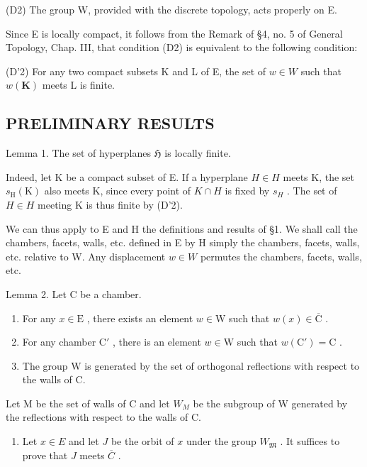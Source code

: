 (D2) The group W, provided with the discrete topology, acts properly on E.

Since E is locally compact, it follows from the Remark of §4, no. 5 of General Topology, Chap. III, that condition (D2) is equivalent to the following condition:

(D'2) For any two compact subsets K and L of E, the set of \(w \in W\) such that \(w(\mathbf{K})\) meets L is finite.

\subsection{PRELIMINARY RESULTS}

Lemma 1. The set of hyperplanes \(\mathfrak{H}\) is locally finite.

Indeed, let K be a compact subset of E. If a hyperplane \(H \in H\) meets K, the set \(s_{\mathrm{H}}(\mathrm{K})\) also meets K, since every point of \(K \cap H\) is fixed by \(s_{H}\) . The set of \(H \in H\) meeting K is thus finite by (D'2).

We can thus apply to E and H the definitions and results of §1. We shall call the chambers, facets, walls, etc. defined in E by H simply the chambers, facets, walls, etc. relative to W. Any displacement \(w \in W\) permutes the chambers, facets, walls, etc.

Lemma 2. Let C be a chamber.

\begin{enumerate}
\def\labelenumi{(\roman{enumi})}
\item
  For any \(x \in \mathrm{E}\) , there exists an element \(w \in \mathrm{W}\) such that \(w(x) \in \overline{\mathrm{C}}\) .
\item
  For any chamber \(\mathrm{C}'\) , there is an element \(w \in \mathrm{W}\) such that \(w(\mathrm{C}') = \mathrm{C}\) .
\item
  The group W is generated by the set of orthogonal reflections with respect to the walls of C.
\end{enumerate}

Let M be the set of walls of C and let \(W_{M}\) be the subgroup of W generated by the reflections with respect to the walls of C.

\begin{enumerate}
\def\labelenumi{(\roman{enumi})}
\tightlist
\item
  Let \(x \in E\) and let \(J\) be the orbit of \(x\) under the group \(W_{\mathfrak{M}}\) . It suffices to prove that \(J\) meets \(\overline{C}\) .
\end{enumerate}


